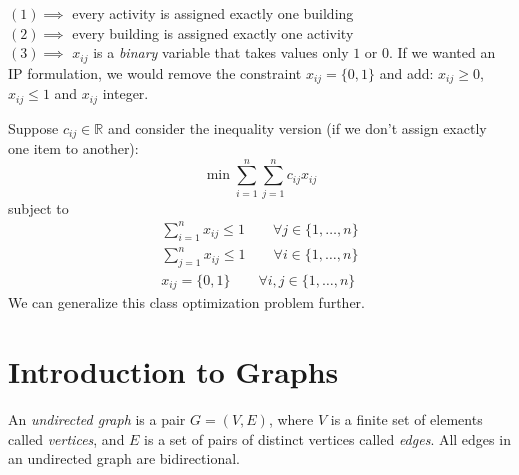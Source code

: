 \begin{exbox}
\begin{example}
        $(1)\implies$ every activity is assigned exactly one building\\
        $(2)\implies$ every building is assigned exactly one activity\\
        $(3)\implies $ $ x_{ij} $ is a \emph{binary} variable that takes
        values only $ 1 $ or $ 0 $. If we wanted an IP formulation,
        we would remove the constraint $ x_{ij}=\{0,1\} $
        and add: $ x_{ij}\geqslant  0 $, $ x_{ij}\leqslant 1 $ and $ x_{ij} $ integer.
    \end{example}
\end{exbox}

Suppose $c_{ij}\in\mathbb{R}$ and consider the inequality version
(if we don't assign exactly one item to another):
\[\min \sum\limits_{i = 1}^{n}\sum\limits_{j = 1}^{n}c_{ij}x_{ij}\]
subject to
\begin{align*}
    \sum\limits_{i = 1}^{n}x_{ij}\le1 \qquad \forall j\in\{1,\dots,n\} \\
    \sum\limits_{j = 1}^{n}x_{ij}\le1 \qquad \forall i\in\{1,\dots,n\} \\
    x_{ij}=\{0,1\} \qquad \forall i,j\in\{1,\dots,n\}
\end{align*}
We can generalize this class optimization problem further.

\chapter{Introduction to Graphs}

\begin{defbox}
    \begin{definition}
        An \emph{undirected graph} is a pair $G=(V,E)$, where $V$ is a finite set
        of elements called \emph{vertices}, and $E$ is a set of pairs of distinct
        vertices called \emph{edges}. All edges in an undirected graph are bidirectional.
    \end{definition}
\end{defbox}

